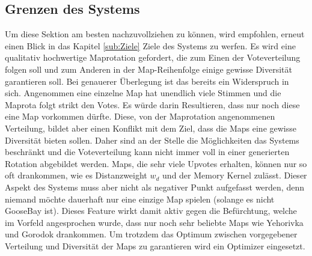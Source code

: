     \subsection{Grenzen des Systems}
        \label{s:grenzen_des_systems}
        Um diese Sektion am besten nachzuvollziehen zu können, wird empfohlen, erneut einen Blick in das Kapitel \ref{sub:Ziele} Ziele des Systems zu
        werfen. Es wird eine qualitativ hochwertige Maprotation gefordert, die zum Einen der Voteverteilung folgen soll und
        zum Anderen in der Map-Reihenfolge einige gewisse Diversität garantieren soll. Bei genauerer Überlegung ist
        das bereits ein Widerspruch in sich. Angenommen eine einzelne Map hat unendlich viele Stimmen und die Maprota 
        folgt strikt den Votes. Es würde darin Resultieren, dass nur noch diese eine Map vorkommen dürfte. Diese, von 
        der Maprotation angenommenen Verteilung, bildet aber einen Konflikt mit dem Ziel, dass die Maps eine gewisse Diversität
        bieten sollen. Daher sind an der Stelle die Möglichkeiten das Systems beschränkt und die Voteverteilung kann 
        nicht immer voll in einer generierten Rotation abgebildet werden. Maps, die sehr viele Upvotes erhalten, können nur so oft drankommen,
        wie es Distanzweight $w_d$ und der Memory Kernel zulässt. Dieser Aspekt des Systems muss aber nicht als negativer Punkt 
        aufgefasst werden, denn niemand möchte dauerhaft nur eine einzige Map spielen (solange es nicht GooseBay ist). 
        Dieses \glqq{}Feature\grqq{} wirkt damit aktiv gegen die Befürchtung, welche im Vorfeld angesprochen wurde,
        dass nur noch sehr beliebte Maps wie Yehorivka und Gorodok drankommen.
        Um trotzdem das Optimum zwischen vorgegebener Verteilung und Diversität der Maps zu garantieren wird ein Optimizer
        eingesetzt.\\
